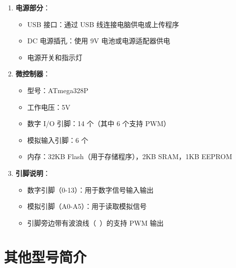 \documentclass[12pt,UTF8]{ctexbook}
\begin{document}
\begin{enumerate}
    \item \textbf{电源部分}：
    \begin{itemize}
        \item USB 接口：通过 USB 线连接电脑供电或上传程序
        \item DC 电源插孔：使用 9V 电池或电源适配器供电
        \item 电源开关和指示灯
    \end{itemize}
    
    \item \textbf{微控制器}：
    \begin{itemize}
        \item 型号：ATmega328P
        \item 工作电压：5V
        \item 数字 I/O 引脚：14 个（其中 6 个支持 PWM）
        \item 模拟输入引脚：6 个
        \item 内存：32KB Flash（用于存储程序），2KB SRAM，1KB EEPROM
    \end{itemize}
    
    \item \textbf{引脚说明}：
    \begin{itemize}
        \item 数字引脚（0-13）：用于数字信号输入输出
        \item 模拟引脚（A0-A5）：用于读取模拟信号
        \item 引脚旁边带有波浪线（~）的支持 PWM 输出
    \end{itemize}
\end{enumerate}

\section{其他型号简介}
\end{document}
